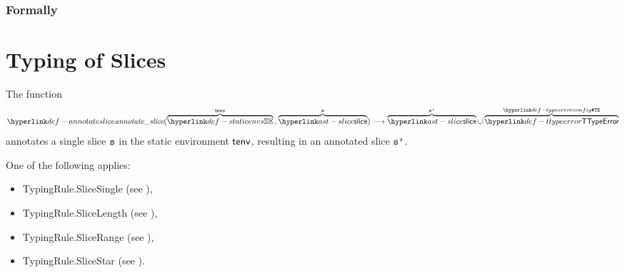 \subsection{Formally}
\begin{mathpar}
\end{mathpar}

\chapter{Typing of Slices \label{chap:typingslices}}
\hypertarget{def-annotateslice}{}
The function
\[
  \annotateslice(\overname{\staticenvs}{\tenv} \aslsep \overname{\slice}{\vs})
  \aslto
  \overname{\slice}{\vsp} \cup \overname{\TTypeError}{\TypeErrorConfig}
\]
annotates a single slice $\vs$ in the static environment $\tenv$,
resulting in an annotated slice $\vsp$.
\ProseOtherwiseTypeError

One of the following applies:
\begin{itemize}
\item TypingRule.SliceSingle (see ),
\item TypingRule.SliceLength (see ),
\item TypingRule.SliceRange (see ),
\item TypingRule.SliceStar (see ).
\end{itemize}

